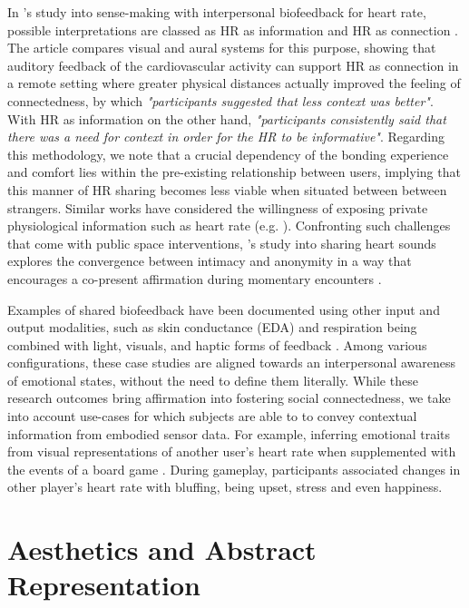 In \citeauthor{slovak_understanding_2012}'s study into sense-making with interpersonal biofeedback for heart rate, possible interpretations are classed as HR as information and HR as connection \cite{slovak_understanding_2012}. The article compares visual and aural systems for this purpose, showing that auditory feedback of the cardiovascular activity can support HR as connection in a remote setting where greater physical distances actually improved the feeling of connectedness, by which \textit{"participants suggested that less context was better"}. With HR as information on the other hand, \textit{"participants consistently said that there was a need for context in order for the HR to be informative"}. Regarding this methodology, we note that a crucial dependency of the bonding experience and comfort lies within the pre-existing relationship between users, implying that this manner of HR sharing becomes less viable when situated between between strangers. Similar works have considered the willingness of exposing private physiological information such as heart rate (e.g. \cite{walmink_displaying_2013}). Confronting such challenges that come with public space interventions, \citeauthor{howell_life-affirming_2019}'s study into sharing heart sounds explores the convergence between intimacy and anonymity in a way that encourages a co-present affirmation during momentary encounters \cite{howell_life-affirming_2019}.

Examples of shared biofeedback have been documented using other input and output modalities, such as skin conductance (EDA) and respiration being combined with light, visuals, and haptic forms of feedback \cite{frey_breeze_2018,howell_biosignals_2016,ashford_eeg_2019}. Among various configurations, these case studies are aligned towards an interpersonal awareness of emotional states, without the need to define them literally. While these research outcomes bring affirmation into fostering social connectedness, we take into account use-cases for which subjects are able to to convey contextual information from embodied sensor data. For example, inferring emotional traits from visual representations of another user's heart rate when supplemented with the events of a board game \cite{frey_remote_2016}. During gameplay, participants associated changes in other player's heart rate with bluffing, being upset, stress and even happiness.

\section{Aesthetics and Abstract Representation}
\label{lit_review:abstract}

